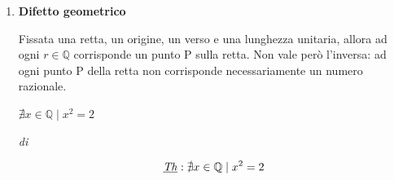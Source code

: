 \begin{enumerate}
    \item \textbf{Difetto geometrico}

        Fissata una retta, un origine, un verso e una lunghezza unitaria, allora ad ogni $r \in \mathbb{Q}$
        corrisponde un punto P sulla retta. Non vale però l'inversa: ad ogni punto P della retta non corrisponde
        necessariamente un numero razionale.

        \begin{proposition}
            \label{pro:rdq-due-irr}
            $\nexists x\in\mathbb{Q} \mid x^2=2$
        \end{proposition}

        \begin{demonstration}
            \textit{di} 

            \[\underbar{\textit{Th}}: \nexists x\in\mathbb{Q} \mid x^2=2\]


\end{demonstration}
\end{enumerate}
